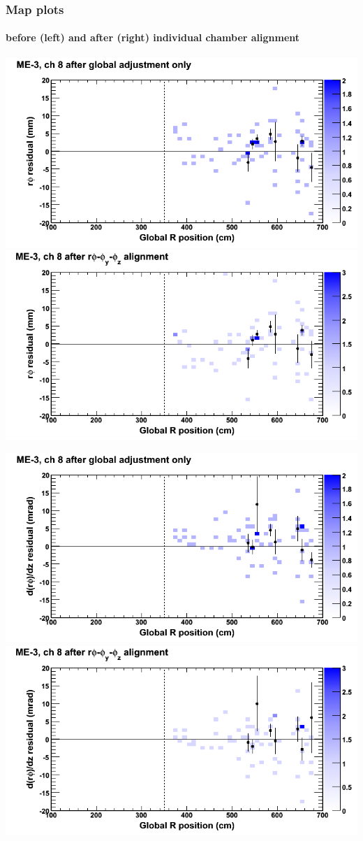 \documentclass[compress]{beamer}
\begin{document}
\begin{frame}
\frametitle{Map plots}
\framesubtitle{before (left) and after (right) individual chamber alignment}
\includegraphics[width=0.5\linewidth]{ringmapplots_3dof/before_CSCvsr_mem3ch08_x.png} \includegraphics[width=0.5\linewidth]{ringmapplots_3dof/after_CSCvsr_mem3ch08_x.png}

\includegraphics[width=0.5\linewidth]{ringmapplots_3dof/before_CSCvsr_mem3ch08_dxdz.png} \includegraphics[width=0.5\linewidth]{ringmapplots_3dof/after_CSCvsr_mem3ch08_dxdz.png}
\end{frame}
\end{document}
